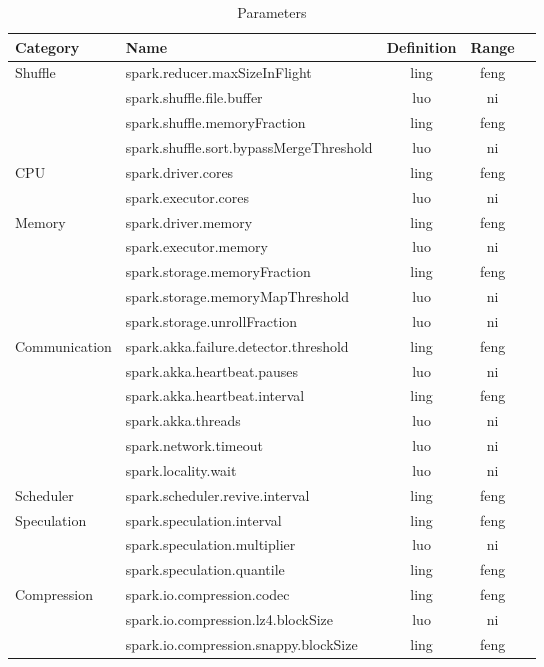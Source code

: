 \documentclass[conference]{IEEEtran}
\begin{document}
\begin{table*}[htbp]
\centering
\caption{Parameters}
\label{table:parameters}
\begin{tabular}{llccl}
\toprule
Category & Name & Definition & Range \\
\midrule
\multirow{4}{2cm}{Shuffle} & spark.reducer.maxSizeInFlight & ling & feng \\ 
& spark.shuffle.file.buffer & luo & ni \\ & spark.shuffle.memoryFraction & ling & feng \\
& spark.shuffle.sort.bypassMergeThreshold & luo & ni \\
\hline

\multirow{2}{2cm}{CPU} & spark.driver.cores & ling & feng \\
& spark.executor.cores & luo & ni \\
\hline

\multirow{5}{2cm}{Memory} & spark.driver.memory & ling & feng \\
& spark.executor.memory & luo & ni \\ & spark.storage.memoryFraction & ling & feng \\
& spark.storage.memoryMapThreshold & luo & ni \\ & spark.storage.unrollFraction & luo & ni \\
\hline

\multirow{6}{2cm}{Communication} & spark.akka.failure.detector.threshold & ling & feng \\
& spark.akka.heartbeat.pauses & luo & ni \\ & spark.akka.heartbeat.interval & ling & feng \\
& spark.akka.threads & luo & ni \\ & spark.network.timeout & luo & ni \\
& spark.locality.wait & luo & ni \\
\hline

\multirow{1}{2cm}{Scheduler} & spark.scheduler.revive.interval & ling & feng \\
\hline

\multirow{3}{2cm}{Speculation} & spark.speculation.interval & ling & feng \\
& spark.speculation.multiplier & luo & ni \\ & spark.speculation.quantile & ling & feng \\
\hline

\multirow{3}{2cm}{Compression} & spark.io.compression.codec & ling & feng \\
& spark.io.compression.lz4.blockSize & luo & ni \\ & spark.io.compression.snappy.blockSize & ling & feng \\
\hline


\end{tabular}
\end{table*}
\end{document}
